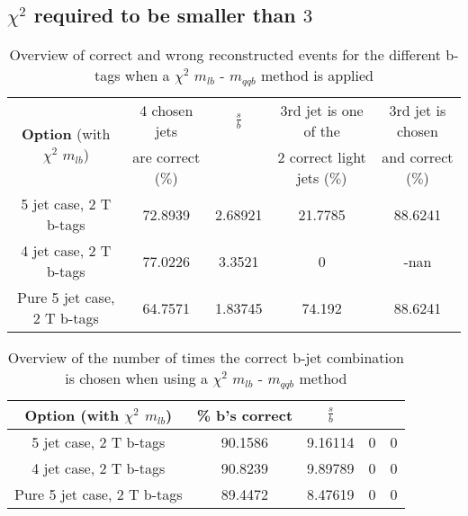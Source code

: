 \documentclass[a4paper,12pt]{report}
\begin{document}
 \subsection{$\chi^{2}$ required to be smaller than $3$}
 \begin{table}[!h] 
 \begin{tabular}{c|c|c|c|c} 
\multirow{2}{*}{\textbf{Option} (with $\chi^{2}$ $m_{lb}$)} & 4 chosen jets & $\frac{s}{b}$ & 3rd jet is one of the & 3rd jet is chosen \\ & are correct ($\%$)    & 	             & 2 correct light jets ($\%$) &  and correct ($\%$)	  \\ \hline 
 5 jet case,      2 T b-tags              & 72.8939 & 2.68921 & 21.7785 & 88.6241 \\ 
 4 jet case,      2 T b-tags              & 77.0226 & 3.3521 & 0 & -nan \\ 
 Pure 5 jet case, 2 T b-tags              & 64.7571 & 1.83745 & 74.192 & 88.6241 \\ 
 \end{tabular} 
 \caption{Overview of correct and wrong reconstructed events for the different b-tags when a $\chi^{2}$ $m_{lb}$ - $m_{qqb}$ method is applied} 
 \end{table} 
 
 \begin{table}[!h] 
 \begin{tabular}{c|c|c|c|c} 
 \textbf{Option} (with $\chi^{2}$ $m_{lb}$) & \% b's correct   & $\frac{s}{b}$ &  &  \\ \hline 
 5 jet case,      2 T b-tags              & 90.1586 & 9.16114 & 0 & 0 \\ 
 4 jet case,      2 T b-tags              & 90.8239 & 9.89789 & 0 & 0 \\ 
 Pure 5 jet case, 2 T b-tags              & 89.4472 & 8.47619 & 0 & 0 \\ 
 \end{tabular} 
 \caption{Overview of the number of times the correct b-jet combination is chosen when using a $\chi^{2}$ $m_{lb}$ - $m_{qqb}$ method} 
 \end{table} 
 
\end{document}
